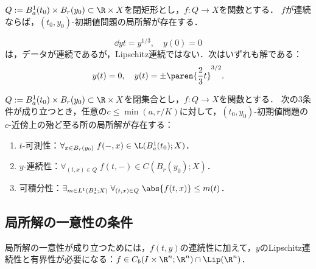\documentclass[uplatex,dvipdfmx]{jsreport}
\begin{document}
\begin{theorem}
    $Q:=B^1_a(t_0)\times B_r(y_0)\subset\R\times X$を閉矩形とし，$f:Q\to X$を関数とする．
    $f$が連続ならば，$(t_0,y_0)$-初期値問題の局所解が存在する．
\end{theorem}

\begin{example}
    \[\dd{y}{t}=y^{1/3},\quad y(0)=0\]
    は，データが連続であるが，Lipschitz連続ではない．次はいずれも解である：
    \[y(t)=0,\quad y(t)=\pm\paren{\frac{2}{3}t}^{3/2}.\]
\end{example}

\begin{theorem}[Caratheodory]
    $Q:=B^1_a(t_0)\times B_r(y_0)\subset\R\times X$を閉集合とし，$f:Q\to X$を関数とする．
    次の3条件が成り立つとき，任意の$c\le\min(a,r/K)$に対して，$(t_0,y_0)$-初期値問題の$c$-近傍上の殆ど至る所の局所解が存在する：
    \begin{enumerate}
        \item $t$-可測性：$\forall_{x\in B_r(y_0)}\;f(-,x)\in \L(B_a^1(t_0);X)$．
        \item $y$-連続性：$\forall_{(t,x)\in Q}\;f(t,-)\in C(B_r(y_0);X)$．
        \item 可積分性：$\exists_{m\in L^1(B_a^1;X)}\;\forall_{(t,x)\in Q}\;\abs{f(t,x)}\le m(t)$．
    \end{enumerate}
\end{theorem}

\subsection{局所解の一意性の条件}

\begin{tcolorbox}[colframe=ForestGreen, colback=ForestGreen!10!white,breakable,colbacktitle=ForestGreen!40!white,coltitle=black,fonttitle=\bfseries\sffamily,
title=]
    局所解の一意性が成り立つためには，$f(t,y)$の連続性に加えて，$y$のLipschitz連続性と有界性が必要になる：$f\in C_b(I\times\R^n;\R^n)\cap\Lip(\R^n)$．
\end{tcolorbox}
\end{document}

